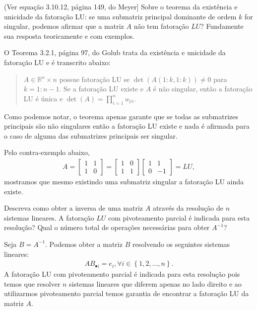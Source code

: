 \documentclass[a4paper,12pt, leqno, answers]{exam}
\newcommand{\mdot}{\bullet}
\begin{document}
\begin{questions}
    \question(Ver equa\c{c}\~{a}o 3.10.12, p\'{a}gina 149, do Meyer\nocite{Meyer:2000:matrix}] Sobre o teorema da exist\^{e}ncia e unicidade da fatora\c{c}\~{a}o LU: se uma submatriz principal dominante de ordem $k$ for singular, podemos afirmar que a matriz $A$ n\~{a}o tem fatora\c{c}\~{a}o $LU$? Fundamente sua resposta teoricamente e com exemplos.
    \begin{solution}
        O Teorema 3.2.1, p\'{a}gina 97, do Golub\nocite{Golub:1996:matrix} trata da exist\^{e}ncia e unicidade da fatora\c{c}\~{a}o LU e \'{e} transcrito abaixo:
        \begin{quote}
            $A \in \mathbb{R}{^n \times n}$ possue fatora\c{c}\~{a}o LU se $\det(A(1:k, 1:k)) \neq 0$ para $k = 1:n - 1$. Se a fatora\c{c}\~{a}o LU existe e $A$ \'{e} n\~{a}o singular, ent\~{a}o a fatora\c{c}\~{a}o LU \'{e} \'{u}nica e $\det(A) = \prod_{i = 1}^n u_{[ii}$.
        \end{quote}

        Como podemos notar, o teorema apenas garante que se todas as submatrizes principais s\~{a}o n\~{a}o singulares ent\~{a}o a fatora\c{c}\~{a}o LU existe e nada \'{e} afirmada para o caso de alguma das submatrizes principais ser singular.

        Pelo contra-exemplo abaixo,
        \begin{align*}
            A = \begin{bmatrix}
                1 & 1 \\
                1 & 0
            \end{bmatrix} = \begin{bmatrix}
                1 & 0 \\
                1 & 1
            \end{bmatrix} \begin{bmatrix}
                1 & 1 \\
                0 & -1
            \end{bmatrix} = L U,
        \end{align*}
        mostramos que mesmo existindo uma submatriz singular a fatora\c{c}\~{a}o LU ainda existe.
    \end{solution}

    \question Descreva como obter a inversa de uma matriz $A$ atrav\'{e}s da resolu\c{c}\~{a}o de $n$ sistemas lineares. A fatora\c{c}\~{a}o $LU$ com pivoteamento parcial \'{e} indicada para esta resolu\c{c}\~{a}o? Qual o número total de opera\c{c}\~{o}es necess\'{a}rias para obter $A^{-1}$?
    \begin{solution}
        Seja $B = A^{-1}$. Podemos obter a matriz $B$ resolvendo os seguintes sistemas lineares:
        \begin{align*}
            A B_{\mdot i} = e_i, \forall i \in \left\{ 1, 2, \ldots, n \right\}.
        \end{align*}
        A fatora\c{c}\~{a}o LU com pivoteamento parcial \'{e} indicada para esta resolu\c{c}\~{a}o pois temos que resolver $n$ sistemas lineares que diferem apenas no lado direito e ao utilizarmos pivoteamento parcial temos garantia de encontrar a fatora\c{c}\~{a}o LU da matriz $A$.


\end{solution}
\end{questions}
\end{document}
